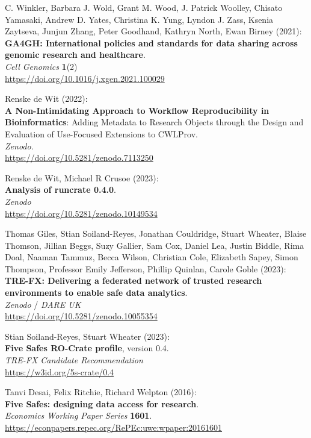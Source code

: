 \documentclass[10pt,letterpaper]{article}
\begin{document}
\begin{thebibliography}{10}
\begin{small}
C. Winkler, Barbara J. Wold, Grant M. Wood, J. Patrick Woolley, Chisato Yamasaki, Andrew D. Yates, Christina K. Yung, Lyndon J. Zass, Ksenia Zaytseva, Junjun Zhang, Peter Goodhand, Kathryn North, Ewan Birney (2021):\\
\textbf{GA4GH: International policies and standards for data sharing
across genomic research and healthcare}.\\
\emph{Cell Genomics} \textbf{1}(2)\\
\url{https://doi.org/10.1016/j.xgen.2021.100029}

Renske de Wit (2022):\\
\textbf{A Non-Intimidating Approach to Workflow Reproducibility in Bioinformatics}: Adding Metadata to Research Objects through the Design and Evaluation of Use-Focused Extensions to CWLProv.\\
\emph{Zenodo}.\\
\url{https://doi.org/10.5281/zenodo.7113250}

Renske de Wit, Michael R Crusoe (2023):\\
\textbf{Analysis of runcrate 0.4.0}.\\
\emph{Zenodo}\\
\url{https://doi.org/10.5281/zenodo.10149534}

Thomas Giles, Stian Soiland-Reyes, Jonathan Couldridge, Stuart Wheater, Blaise Thomson, Jillian Beggs, Suzy Gallier, Sam Cox, Daniel Lea, Justin Biddle, Rima Doal, Naaman Tammuz, Becca Wilson, Christian Cole, Elizabeth Sapey, Simon Thompson, Professor Emily Jefferson, Phillip Quinlan, Carole Goble (2023):\\
\textbf{TRE-FX: Delivering a federated network of trusted research environments to enable safe data analytics}.\\
\emph{Zenodo} / \emph{DARE UK} \\
\url{https://doi.org/10.5281/zenodo.10055354}

Stian Soiland-Reyes, Stuart Wheater (2023):\\
\textbf{Five Safes RO-Crate profile}, version 0.4.\\
\emph{TRE-FX Candidate Recommendation} \\
\url{https://w3id.org/5s-crate/0.4}

Tanvi Desai, Felix Ritchie, Richard Welpton (2016):\\
\textbf{Five Safes: designing data access for research}.\\
\emph{Economics Working Paper Series} \textbf{1601}.\\
\url{https://econpapers.repec.org/RePEc:uwe:wpaper:20161601}


\end{small}
\end{thebibliography}
\end{document}
